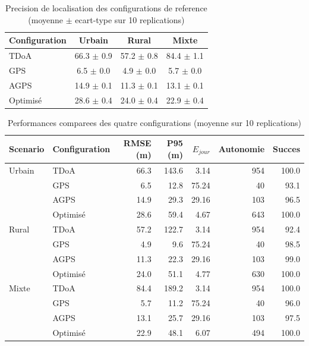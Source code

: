 \begin{table}[H]
\centering
\caption{Precision de localisation des configurations de reference (moyenne $\pm$ ecart-type sur 10 replications)}
\label{tab:ref_precision}
\small
\begin{tabular}{|l|c|c|c|}
\hline
\rowcolor{myColor!20}
\textbf{Configuration} & \textbf{Urbain} & \textbf{Rural} & \textbf{Mixte} \\
\hline
TDoA & 66.3 $\pm$ 0.9 & 57.2 $\pm$ 0.8 & 84.4 $\pm$ 1.1 \\ \hline
GPS & 6.5 $\pm$ 0.0 & 4.9 $\pm$ 0.0 & 5.7 $\pm$ 0.0 \\ \hline
AGPS & 14.9 $\pm$ 0.1 & 11.3 $\pm$ 0.1 & 13.1 $\pm$ 0.1 \\ \hline
Optimisé & 28.6 $\pm$ 0.4 & 24.0 $\pm$ 0.4 & 22.9 $\pm$ 0.4 \\ \hline
\end{tabular}
\end{table}

\begin{table}[H]
\centering
\caption{Performances comparees des quatre configurations (moyenne sur 10 replications)}
\label{tab:resultats_complets}
\small
\begin{tabular}{|l|l|r|r|r|r|r|}
\hline
\rowcolor{myColor!20}
\textbf{Scenario} & \textbf{Configuration} & \textbf{RMSE (m)} & \textbf{P95 (m)} & \textbf{$E_{jour}$} & \textbf{Autonomie} & \textbf{Succes} \\
\hline
Urbain & TDoA & 66.3 & 143.6 & 3.14 & 954 & 100.0 \\ \hline
 & GPS & 6.5 & 12.8 & 75.24 & 40 & 93.1 \\ \hline
 & AGPS & 14.9 & 29.3 & 29.16 & 103 & 96.5 \\ \hline
 & Optimisé & 28.6 & 59.4 & 4.67 & 643 & 100.0 \\ \hline
Rural & TDoA & 57.2 & 122.7 & 3.14 & 954 & 92.4 \\ \hline
 & GPS & 4.9 & 9.6 & 75.24 & 40 & 98.5 \\ \hline
 & AGPS & 11.3 & 22.3 & 29.16 & 103 & 99.0 \\ \hline
 & Optimisé & 24.0 & 51.1 & 4.77 & 630 & 100.0 \\ \hline
Mixte & TDoA & 84.4 & 189.2 & 3.14 & 954 & 100.0 \\ \hline
 & GPS & 5.7 & 11.2 & 75.24 & 40 & 96.0 \\ \hline
 & AGPS & 13.1 & 25.7 & 29.16 & 103 & 97.5 \\ \hline
 & Optimisé & 22.9 & 48.1 & 6.07 & 494 & 100.0 \\ \hline
\end{tabular}
\end{table}

